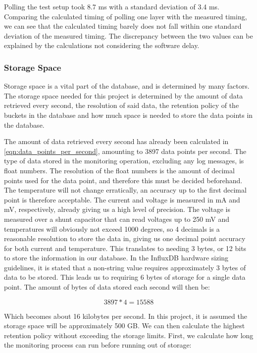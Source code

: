 \documentclass[main.tex]{subfiles}
\begin{document}
Polling the test setup took 8.7 ms with a standard deviation of 3.4 ms. Comparing the calculated timing of polling one layer with the measured timing, we can see that the calculated timing barely does not fall within one standard deviation of the measured timing. The discrepancy between the two values can be explained by the calculations not considering the software delay.

\subsubsection{Storage Space}
Storage space is a vital part of the database, and is determined by many factors. The storage space needed for this project is determined by the amount of data retrieved every second, the resolution of said data, the retention policy of the buckets in the database and how much space is needed to store the data points in the database.

The amount of data retrieved every second has already been calculated in \autoref{eqn:data_points_per_second}, amounting to 3897 data points per second. The type of data stored in the monitoring operation, excluding any log messages, is float numbers. The resolution of the float numbers is the amount of decimal points used for the data point, and therefore this must be decided beforehand. The temperature will not change erratically, an accuracy up to the first decimal point is therefore acceptable. The current and voltage is measured in mA and mV, respectively, already giving us a high level of precision. The voltage is measured over a shunt capacitor that can read voltages up to 250 mV and temperatures will obviously not exceed 1000 degrees, so 4 decimals is a reasonable resolution to store the data in, giving us one decimal point accuracy for both current and temperature. This translates to needing 3 bytes, or 12 bits to store the information in our database. In the InfluxDB hardware sizing guidelines, it is stated that a non-string value requires approximately 3 bytes of data to be stored\cite{influx_sizing}. This leads us to requiring 6 bytes of storage for a single data point. The amount of bytes of data stored each second will then be: 

\begin{equation} \label{eqn:total_bytes_per_second}
3897*4 = 15588 
\end{equation}

Which becomes about 16 kilobytes per second. In this project, it is assumed the storage space will be approximately 500 GB. We can then calculate the highest retention policy without exceeding the storage limits. First, we calculate how long the monitoring process can run before running out of storage:
\end{document}
